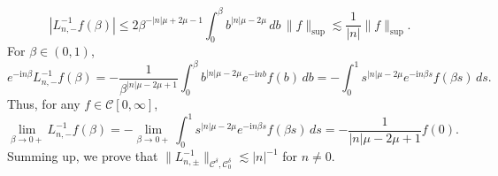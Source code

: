\documentclass[11pt]{article}
\makeatletter
\renewenvironment{proof}[1][\proofname]{\par
  \vspace{-.7\topsep}%
  \pushQED{\qed}%
  \normalfont
  \topsep0pt \partopsep0pt %
  \trivlist
  \item[\hskip\labelsep
        \itshape
    #1\@addpunct{.}]\ignorespaces
}{%
  \popQED\endtrivlist\@endpefalse
  \addvspace{6pt plus 6pt} %
}
\theoremstyle{definition}
\newtheorem{lemma}[theorem]{Lemma}
\newtheorem{definition}[theorem]{Definition}
\theoremstyle{remark}
\numberwithin{equation}{section}
\newcommand{\mcal}{\mathcal}
\newcommand{\norm}[1]{\lVert #1 \rVert}
\makeatother
\begin{document}
\begin{proof}
\[|L_{n,-}^{-1} f(\beta)| \leq 2\beta^{-|n|\mu + 2\mu - 1} \int_0^\beta b^{|n|\mu - 2\mu} \,db \, \norm{f}_{\sup} \lesssim \frac{1}{|n|} \norm{f}_{\sup}.\]
For $\beta \in (0,1)$,
\[e^{-\textrm{i}n\beta} L_{n,-}^{-1} f(\beta) = - \frac{1}{\beta^{|n|\mu - 2\mu + 1}} \int_0^\beta b^{|n|\mu - 2\mu} e^{-\textrm{i}n b} f(b) \,db = - \int_0^1 s^{|n|\mu - 2\mu} e^{-\textrm{i}n\beta s} f(\beta s) \,ds.\]
Thus, for any $f\in\mcal{C}[0,\infty]$,
\[\lim_{\beta \to 0+} L_{n,-}^{-1} f(\beta) = - \lim_{\beta \to 0+} \int_0^1 s^{|n|\mu - 2\mu} e^{-\textrm{i}n\beta s} f(\beta s) \,ds = - \frac{1}{|n|\mu - 2\mu + 1} f(0).\]
Summing up, we prove that $\norm{L_{n,\pm}^{-1}}_{\mcal{C}^\delta, \mcal{C}^\delta_0} \lesssim |n|^{-1}$ for $n\neq 0$.
\end{proof}

\end{document}

